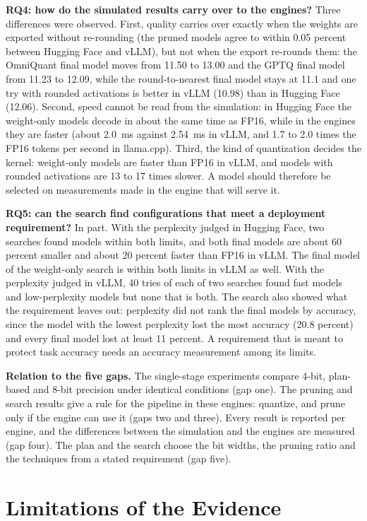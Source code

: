 \textbf{RQ4: how do the simulated results carry over to the engines?} Three differences were observed. First, quality carries over exactly when the weights are exported without re-rounding (the pruned models agree to within 0.05 percent between Hugging Face and vLLM), but not when the export re-rounds them: the OmniQuant final model moves from 11.50 to 13.00 and the GPTQ final model from 11.23 to 12.09, while the round-to-nearest final model stays at 11.1 and one try with rounded activations is better in vLLM (10.98) than in Hugging Face (12.06). Second, speed cannot be read from the simulation: in Hugging Face the weight-only models decode in about the same time as FP16, while in the engines they are faster (about 2.0~ms against 2.54~ms in vLLM, and 1.7 to 2.0 times the FP16 tokens per second in llama.cpp). Third, the kind of quantization decides the kernel: weight-only models are faster than FP16 in vLLM, and models with rounded activations are 13 to 17 times slower. A model should therefore be selected on measurements made in the engine that will serve it.

\textbf{RQ5: can the search find configurations that meet a deployment requirement?} In part. With the perplexity judged in Hugging Face, two searches found models within both limits, and both final models are about 60 percent smaller and about 20 percent faster than FP16 in vLLM. The final model of the weight-only search is within both limits in vLLM as well. With the perplexity judged in vLLM, 40 tries of each of two searches found fast models and low-perplexity models but none that is both. The search also showed what the requirement leaves out: perplexity did not rank the final models by accuracy, since the model with the lowest perplexity lost the most accuracy (20.8 percent) and every final model lost at least 11 percent. A requirement that is meant to protect task accuracy needs an accuracy measurement among its limits.

\textbf{Relation to the five gaps.} The single-stage experiments compare 4-bit, plan-based and 8-bit precision under identical conditions (gap one). The pruning and search results give a rule for the pipeline in these engines: quantize, and prune only if the engine can use it (gaps two and three). Every result is reported per engine, and the differences between the simulation and the engines are measured (gap four). The plan and the search choose the bit widths, the pruning ratio and the techniques from a stated requirement (gap five).

\section{Limitations of the Evidence}
\label{sec:ch5-limits}

